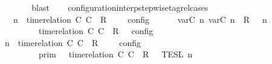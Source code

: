 \begin{isabellebody}
\ {\isacharasterisk}\isanewline
\ \ \ \ \ \ \isamarkupfalse%
\ blast\isanewline
\ \ \isamarkupfalse%
\isanewline
{}\isamarkupfalse%
%
\endisatagproof
{\isafoldproof}%
%
\isadelimproof
\isanewline
%
\endisadelimproof
\isanewline
{}\isamarkupfalse%
\ configuration{\isacharunderscore}interp{\isacharunderscore}stepwise{\isacharunderscore}tagrel{\isacharunderscore}cases{\isacharcolon}\isanewline
\ \ \ {\isacartoucheopen}{\isasymlbrakk}\ {\isasymGamma}{\isacharcomma}\ n\ {\isasymturnstile}\ {\isacharparenleft}{\isacharparenleft}time{\isacharminus}relation\ {\isasymlfloor}C\ C\ {\isasymin}\ R{\isacharparenright}\ {\isacharhash}\ {\isasymPsi}{\isacharparenright}\ {\isasymtriangleright}\ {\isasymPhi}\ {\isasymrbrakk}\isactrlsub c\isactrlsub o\isactrlsub n\isactrlsub f\isactrlsub i\isactrlsub g\isanewline
\ \ \ \ {\isacharequal}\ {\isasymlbrakk}\ {\isacharparenleft}{\isacharparenleft}{\isasymlfloor}{\isasymtau}\isactrlsub v\isactrlsub a\isactrlsub r{\isacharparenleft}C\ n{\isacharparenright}{\isacharcomma}\ {\isasymtau}\isactrlsub v\isactrlsub a\isactrlsub r{\isacharparenleft}C\ n{\isacharparenright}{\isasymrfloor}\ {\isasymin}\ R{\isacharparenright}\ {\isacharhash}\ {\isasymGamma}{\isacharparenright}{\isacharcomma}\ n\isanewline
\ \ \ \ \ \ \ \ {\isasymturnstile}\ {\isasymPsi}\ {\isasymtriangleright}\ {\isacharparenleft}{\isacharparenleft}time{\isacharminus}relation\ {\isasymlfloor}C\ C\ {\isasymin}\ R{\isacharparenright}\ {\isacharhash}\ {\isasymPhi}{\isacharparenright}\ {\isasymrbrakk}\isactrlsub c\isactrlsub o\isactrlsub n\isactrlsub f\isactrlsub i\isactrlsub g{\isacartoucheclose}\isanewline
%
\isadelimproof
%
\endisadelimproof
%
\isatagproof
{}\isamarkupfalse%
\ {\isacharminus}\isanewline
\ \ \isamarkupfalse%
\ {\isacartoucheopen}{\isasymlbrakk}\ {\isasymGamma}{\isacharcomma}\ n\ {\isasymturnstile}\ {\isacharparenleft}time{\isacharminus}relation\ {\isasymlfloor}C\ C\ {\isasymin}\ R{\isacharparenright}\ {\isacharhash}\ {\isasymPsi}\ {\isasymtriangleright}\ {\isasymPhi}\ {\isasymrbrakk}\isactrlsub c\isactrlsub o\isactrlsub n\isactrlsub f\isactrlsub i\isactrlsub g\isanewline
\ \ \ \ \ \ \ \ {\isacharequal}\ {\isasymlbrakk}{\isasymlbrakk}\ {\isasymGamma}\ {\isasymrbrakk}{\isasymrbrakk}\isactrlsub p\isactrlsub r\isactrlsub i\isactrlsub m\ {\isasyminter}\ {\isasymlbrakk}{\isasymlbrakk}\ {\isacharparenleft}time{\isacharminus}relation\ {\isasymlfloor}C\ C\ {\isasymin}\ R{\isacharparenright}\ {\isacharhash}\ {\isasymPsi}\ {\isasymrbrakk}{\isasymrbrakk}\isactrlsub T\isactrlsub E\isactrlsub S\isactrlsub L\isactrlbsup {\isasymge}\ n\isactrlesup \isanewline

\end{isabellebody}
